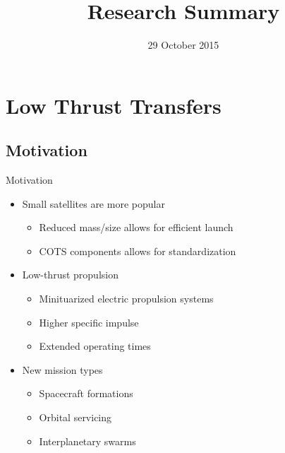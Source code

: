 \documentclass[11pt,professionalfonts]{beamer}
\title[Research Summary]{\large\bf  Research Summary}
\author{\vspace*{-0.3cm}}
\date{29 October 2015}
\institute{
	\footnotesize
	{\normalsize\bf{Shankar Kulumani}}\\
	Ph.D. student\\
	\vspace*{0.2cm}
  	\bf{Department of Mechanical \& Aerospace Engineering}\\ \vspace*{0.5cm}
 	\begin{figure} %
       	\texttt{[image: gw\_txh\_2cs\_pos]}
  	\end{figure}
}
\begin{document}

\setcounter{framenumber}{-1}
\begin{frame} %
  \titlepage
\end{frame}   %

\section{Low Thrust Transfers}
\subsection{Motivation}

\begin{frame}{Motivation} %
	\begin{itemize}
		\item Small satellites are more popular
		\begin{itemize}
			\item Reduced mass/size allows for efficient launch
			\item COTS components allows for standardization
		\end{itemize}
		\pause
		\item Low-thrust propulsion
		\begin{itemize}
			\item Minituarized electric propulsion systems
			\item Higher specific impulse
			\item Extended operating times 
		\end{itemize}
		\pause
		\item New mission types
		\begin{itemize}
			\item Spacecraft formations
			\item Orbital servicing
			\item Interplanetary swarms
		\end{itemize}
	\end{itemize}
	
\end{frame} %
\end{document}
